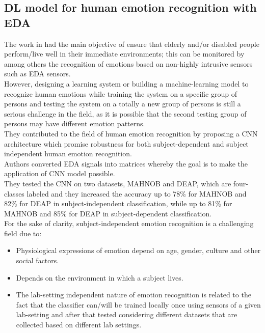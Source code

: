 \subsection{DL model for human emotion recognition with EDA}
The work in \cite{al2019deep} had the main objective of ensure that elderly and/or disabled people perform/live well in their immediate environments; this can be monitored by among others the recognition of emotions based on non-highly intrusive sensors such as EDA sensors.
\\
However, designing a learning system or building a machine-learning model to recognize human emotions while training the system on a specific group of persons and testing the system on a totally a new group of persons is still a serious challenge in the field, as it is possible that the second testing group of persons may have different emotion patterns.
\\ \indent
They contributed to the field of human emotion recognition by proposing a CNN architecture which promise robustness for both subject-dependent and subject independent human emotion recognition.
\\
Authors converted EDA signals into matrices whereby the goal is to make the application of CNN model possible.
\\
They tested the CNN on two datasets, MAHNOB and DEAP, which are four-classes labeled and they increased the accuracy up to 78\% for MAHNOB and 82\% for DEAP in subject-independent classification, while up to 81\% for MAHNOB and 85\% for DEAP in subject-dependent classification.
\\ \indent
For the sake of clarity, subject-independent emotion recognition is a challenging field due to:
\begin{itemize}
	\item Physiological expressions of emotion depend on age, gender, culture and other social factors.
	\item Depends on the environment in which a subject lives.
	\item The lab-setting independent nature of emotion recognition is related to the fact that the classifier can/will be trained locally once using sensors of a given lab-setting and after that tested considering different datasets that are collected based on different lab settings. 
\end{itemize}

